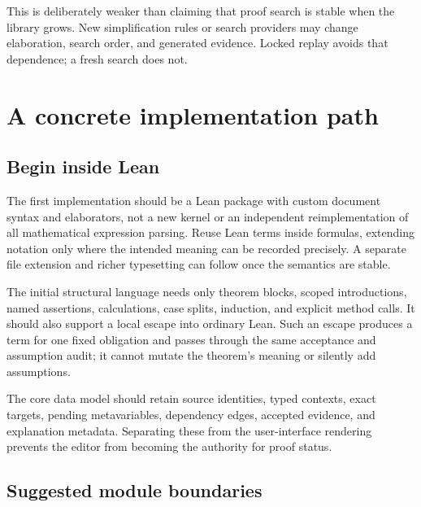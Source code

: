 \documentclass[11pt,a4paper]{article}
\begin{document}
This is deliberately weaker than claiming that proof search is stable when the library grows. New simplification rules or search providers may change elaboration, search order, and generated evidence. Locked replay avoids that dependence; a fresh search does not.

\section{A concrete implementation path}
\label{sec:implementation}

\subsection{Begin inside Lean}

The first implementation should be a Lean package with custom document syntax and elaborators, not a new kernel or an independent reimplementation of all mathematical expression parsing. Reuse Lean terms inside formulas, extending notation only where the intended meaning can be recorded precisely. A separate file extension and richer typesetting can follow once the semantics are stable.

The initial structural language needs only theorem blocks, scoped introductions, named assertions, calculations, case splits, induction, and explicit method calls. It should also support a local escape into ordinary Lean. Such an escape produces a term for one fixed obligation and passes through the same acceptance and assumption audit; it cannot mutate the theorem's meaning or silently add assumptions.

The core data model should retain source identities, typed contexts, exact targets, pending metavariables, dependency edges, accepted evidence, and explanation metadata. Separating these from the user-interface rendering prevents the editor from becoming the authority for proof status.

\subsection{Suggested module boundaries}
\end{document}
